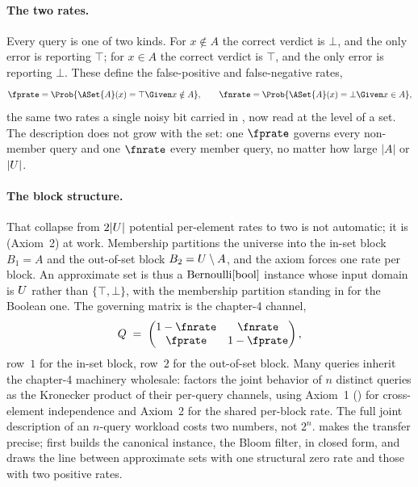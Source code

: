 \paragraph{The two rates.}
Every query is one of two kinds. For $x \notin A$ the correct verdict is
$\bot$, and the only error is reporting $\top$; for $x \in A$ the correct
verdict is $\top$, and the only error is reporting $\bot$. These define
the false-positive and false-negative
rates,
\[
  \fprate = \Prob{\ASet{A}(x) = \top \Given x \notin A},
  \qquad
  \fnrate = \Prob{\ASet{A}(x) = \bot \Given x \in A},
\]
the same two rates a single noisy bit carried in ,
now read at the level of a set. The description does not grow with the
set: one $\fprate$ governs every non-member query and one $\fnrate$ every
member query, no matter how large $|A|$ or $|U|$.

\paragraph{The block structure.}
That collapse from $2|U|$ potential per-element rates to two is
not automatic; it is  (Axiom~2) at work.
Membership partitions the universe into the in-set block $B_1 = A$ and the
out-of-set block $B_2 = U \setminus A$, and the axiom forces one
rate per block. An approximate set is thus a $\mathrm{Bernoulli}[\mathrm{bool}]$
instance whose input domain is $U$ rather than $\{\top, \bot\}$,
with the membership partition standing in for the Boolean one. The
governing matrix is the chapter-4 channel,
\[
  Q \;=\;
  \begin{pmatrix}
    1 - \fnrate & \fnrate \\
    \fprate & 1 - \fprate
  \end{pmatrix},
\]
row~$1$ for the in-set block, row~$2$ for the out-of-set block. Many
queries inherit the chapter-4 machinery wholesale:
 factors the joint behavior of $n$ distinct queries
as the Kronecker product of their per-query channels, using Axiom~1
() for cross-element independence and Axiom~2 for
the shared per-block rate. The full joint description of an $n$-query
workload costs two numbers, not $2^n$.  makes
the transfer precise;  first builds the
canonical instance, the Bloom filter, in closed form, and
 draws the line between approximate sets
with one structural zero rate and those with two positive rates.
